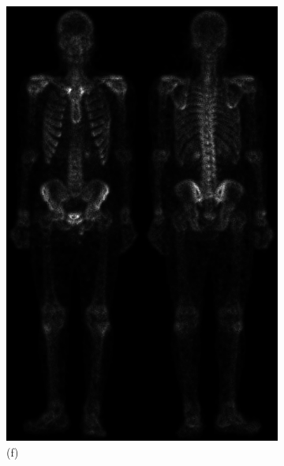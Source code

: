 \begin{figure}[h!]
\begin{subfigure}[b]{0.4\linewidth}
    	\includegraphics[width=\linewidth]{myfigure/p2/2-f.png}
		\caption*{(f)}
		\label{fig:2f}
  	\end{subfigure}
  	\begin{subfigure}[b]{0.4\linewidth}

\end{subfigure}
\end{figure}
